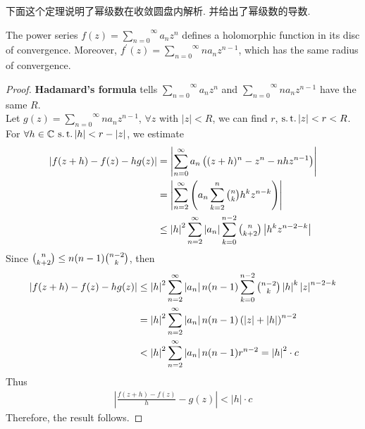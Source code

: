 	\vspace{2em}
	下面这个定理说明了幂级数在收敛圆盘内解析. 并给出了幂级数的导数.
	\begin{thm}\label{thm 3.1.2}
		The power series $f(z) = \overset{\infty}{\underset{n = 0}{\sum}}{a_n z^n}$ defines a holomorphic function in its disc of convergence. Moreover, $f^{'}(z) = \overset{\infty}{\underset{n = 0}{\sum}}{n a_n z^{n - 1}}$, which has the same radius of convergence.
		
		\vspace{2em}
		\begin{proof}
			\textbf{Hadamard's formula} tells $\overset{\infty}{\underset{n = 0}{\sum}}{a_n z^n}$ and $\overset{\infty}{\underset{n = 0}{\sum}}{n a_n z^{n - 1}}$ have the same $R$.\\
			Let $g(z) = \overset{\infty}{\underset{n = 0}{\sum}}{n a_n z^{n - 1}}$, $\forall z$ with $\left| z \right| < R$, we can find $r$, $\operatorname{s.t.} \left| z \right| < r < R$.\\
			For $\forall h \in \mathbb{C}$ $\operatorname{s.t.} \left| h \right| < r - \left| z \right|$, we estimate
			\begin{align}
				\left| f(z + h) - f(z) - hg(z) \right| 
				&= \left| \sum_{n = 0}^{\infty}{a_n \left( (z + h)^n - z^n - nhz^{n - 1} \right)} \right| \\
				&= \left| \sum_{n = 2}^{\infty}{\left( a_n \sum_{k = 2}^{n}{\tbinom{n}{k} h^k z^{n - k}} \right)} \right| \\
				&\leq \left| h \right|^2 \sum_{n = 2}^{\infty}{\left| a_n \right|} \sum_{k = 0}^{n - 2}{\tbinom{n}{k + 2} \left| h^k z^{n - 2 - k} \right|}
			\end{align}
			\newpage
			Since $\tbinom{n}{k + 2} \leq n(n - 1)\tbinom{n - 2}{k}$, then
			\begin{align}
				\left| f(z + h) - f(z) - hg(z) \right| 
				&\leq \left| h \right|^2 \sum_{n = 2}^{\infty}{\left| a_n \right| n(n - 1)} \sum_{k = 0}^{n - 2}{\tbinom{n - 2}{k} \left| h \right|^k \left| z \right|^{n - 2 - k}} \\
				&= \left| h \right|^2 \sum_{n = 2}^{\infty}{\left| a_n \right| n(n - 1) \left( \left| z \right| + \left| h \right| \right)^{n - 2}} \\
				&< \left| h \right|^2 \sum_{n = 2}^{\infty}{\left| a_n \right| n(n - 1) r^{n - 2}} = \left| h \right|^2 \cdot c 
			\end{align}
			Thus
			\begin{align}
				\left| \frac{f(z + h) - f(z)}{h} - g(z) \right| < \left| h \right| \cdot c
			\end{align}
			Therefore, the result follows.
		\end{proof}
	\end{thm}


